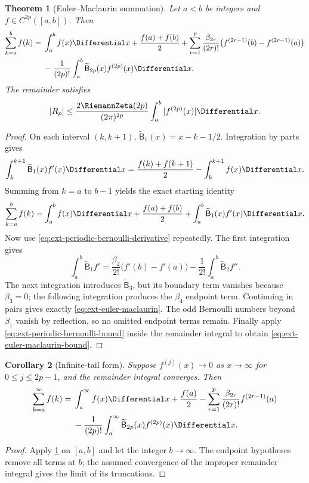 \documentclass[11pt,a4paper,oneside,openany]{book}
\newtheorem{theorem}{Theorem}[chapter]
\newtheorem{corollary}[theorem]{Corollary}
\theoremstyle{definition}
\theoremstyle{remark}
\begin{document}
\begin{theorem}[Euler--Maclaurin summation]
\label{thm:ext-euler-maclaurin}
Let \(a<b\) be integers and \(f\in C^{2p}([a,b])\).  Then
\begin{align}
 \sum_{k=a}^{b}f(k)
 ={}&\int_a^b f(x)\Differential x+\frac{f(a)+f(b)}2
 +\sum_{r=1}^{p}\frac{\beta_{2r}}{(2r)!}
   \bigl(f^{(2r-1)}(b)-f^{(2r-1)}(a)\bigr)
 \notag\\
 &-\frac1{(2p)!}\int_a^b
   \widetilde{\mathsf B}_{2p}(x)f^{(2p)}(x)\Differential x.
 \label{eq:ext-euler-maclaurin}
\end{align}
The remainder satisfies
\begin{equation}\label{eq:ext-euler-maclaurin-bound}
 |R_p|\le
 \frac{2\RiemannZeta(2p)}{(2\pi)^{2p}}
 \int_a^b|f^{(2p)}(x)|\Differential x.
\end{equation}
\end{theorem}
\begin{proof}
On each interval \((k,k+1)\),
\(\widetilde{\mathsf B}_1(x)=x-k-1/2\).  Integration by parts gives
\[
 \int_k^{k+1}\widetilde{\mathsf B}_1(x)f'(x)\Differential x
 =\frac{f(k)+f(k+1)}2-\int_k^{k+1}f(x)\Differential x.
\]
Summing from \(k=a\) to \(b-1\) yields the exact starting identity
\begin{equation}\label{eq:ext-em-start}
 \sum_{k=a}^{b}f(k)
 =\int_a^b f(x)\Differential x+\frac{f(a)+f(b)}2
 +\int_a^b\widetilde{\mathsf B}_1(x)f'(x)\Differential x.
\end{equation}
Now use \eqref{eq:ext-periodic-bernoulli-derivative} repeatedly.  The first
integration gives
\[
 \int_a^b\widetilde{\mathsf B}_1f'
 =\frac{\beta_2}{2!}\bigl(f'(b)-f'(a)\bigr)
 -\frac1{2!}\int_a^b\widetilde{\mathsf B}_2f''.
\]
The next integration introduces \(\widetilde{\mathsf B}_3\), but its boundary
term vanishes because \(\beta_3=0\); the following integration produces the
\(\beta_4\) endpoint term.  Continuing in pairs gives exactly
\eqref{eq:ext-euler-maclaurin}.  The odd Bernoulli numbers beyond
\(\beta_1\) vanish by reflection, so no omitted endpoint terms remain.
Finally apply \eqref{eq:ext-periodic-bernoulli-bound} inside the remainder
integral to obtain \eqref{eq:ext-euler-maclaurin-bound}.
\end{proof}

\begin{corollary}[Infinite-tail form]
Suppose \(f^{(j)}(x)\to0\) as \(x\to\infty\) for
\(0\le j\le2p-1\), and the remainder integral converges.  Then
\begin{align}
 \sum_{k=a}^{\infty}f(k)
 ={}&\int_a^\infty f(x)\Differential x+\frac{f(a)}2
 -\sum_{r=1}^{p}\frac{\beta_{2r}}{(2r)!}f^{(2r-1)}(a)
 \notag\\
 &-\frac1{(2p)!}\int_a^\infty
 \widetilde{\mathsf B}_{2p}(x)f^{(2p)}(x)\Differential x.
 \label{eq:ext-euler-maclaurin-tail}
\end{align}
\end{corollary}
\begin{proof}
Apply \cref{thm:ext-euler-maclaurin} on \([a,b]\) and let the integer
\(b\to\infty\).  The endpoint hypotheses remove all terms at \(b\); the
assumed convergence of the improper remainder integral gives the limit of its
truncations.
\end{proof}
\end{document}

